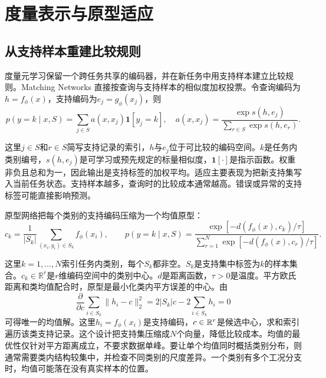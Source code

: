 \section{度量表示与原型适应}

\subsection{从支持样本重建比较规则}

度量元学习保留一个跨任务共享的编码器，并在新任务中用支持样本建立比较规则。Matching Networks 直接按查询与支持样本的相似度加权投票\cite{vinyals2016matching}。令查询编码为$h=f_\phi(x)$，支持编码为$e_j=g_\phi(x_j)$，则
\begin{equation}
 p(y=k\mid x,S)=\sum_{j\in S}a(x,x_j)\mathbf 1[y_j=k],
\quad
 a(x,x_j)=\frac{\exp s(h,e_j)}{\sum_{r\in S}\exp s(h,e_r)}.
\end{equation}

这里$j\in S$和$r\in S$简写支持记录的索引，$h$与$e_j$位于可比较的编码空间。$k$是任务内类别编号，$s(h,e_j)$是可学习或预先规定的标量相似度，$\mathbf1[\cdot]$是指示函数。权重非负且总和为一，因此输出是支持标签的加权平均。适应主要表现为把新支持集写入当前任务状态。支持样本越多，查询时的比较成本通常越高。错误或异常的支持标签可能直接影响预测。

原型网络把每个类别的支持编码压缩为一个均值原型\cite{snell2017proto}：
\begin{equation}
 c_k=\frac{1}{|S_k|}\sum_{(x_i,y_i)\in S_k}f_\phi(x_i),
\qquad
 p(y=k\mid x,S)=
 \frac{\exp[-d(f_\phi(x),c_k)/\tau]}
 {\sum_{r=1}^{N}\exp[-d(f_\phi(x),c_r)/\tau]}.
\label{eq:meta-prototype-probability}
\end{equation}

这里$k=1,\ldots,N$索引任务内类别，每个$S_k$都非空。$S_k$是支持集中标签为$k$的样本集合。$c_k\in\mathbb R^r$是$r$维编码空间中的类别中心。$d$是距离函数，$\tau>0$是温度。平方欧氏距离和类均值配合时，原型是最小化类内平方误差的中心。由
\begin{equation}
\frac{\partial}{\partial c}\sum_{i\in S_k}\|h_i-c\|_2^2
=2|S_k|c-2\sum_{i\in S_k}h_i=0
\end{equation}
可得唯一的均值解。这里$h_i=f_\phi(x_i)$是支持编码，$c\in\mathbb{R}^r$是候选中心，求和索引遍历该类支持记录。这个设计把支持集压缩成$N$个向量，降低比较成本。均值的最优性仅针对平方距离成立，不要求数据单峰。要让单个均值同时概括类别分布，则通常需要类内结构较集中，并检查不同类别的尺度差异。一个类别有多个工况分支时，均值可能落在没有真实样本的位置。

